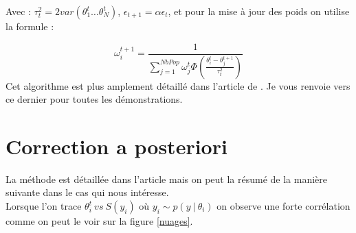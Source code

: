 Avec : $\tau^2_t = 2var(\theta_1^t \dots \theta_N^t)$, $\epsilon_{t+1} = \alpha\epsilon_t$, et pour la mise à jour des poids on utilise la formule : 

\[ \omega^{t+1}_i = \frac{1}{ \sum_{j=1}^{NbPop}\omega_{j}^t\Phi(\frac{\theta_i^t - \theta_j^{t+1}}{\tau^2_t})} \]
Cet algorithme est plus amplement détaillé dans l'article de \cite{0805.2256v9}. Je vous renvoie vers ce dernier pour toutes les démonstrations.

\chapter{Correction a posteriori} \label{correction}
La méthode est détaillée dans l'article \cite{blum:tel-00766196} mais on peut la résumé de la manière suivante dans le cas qui nous intéresse.\\
Lorsque l'on trace $\theta_i^t~vs~S(y_i)$ où $y_i \sim p(y~|~\theta_i)$ on observe une forte corrélation comme on peut le voir sur la figure \ref{nuages}. 


